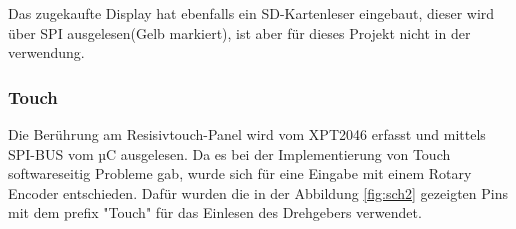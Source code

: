         Das zugekaufte Display hat ebenfalls ein SD-Kartenleser eingebaut, dieser wird 
        über SPI ausgelesen(Gelb markiert), ist aber für dieses Projekt nicht in der verwendung. 


        \subsubsection{Touch}
        Die Berührung am Resisivtouch-Panel wird vom XPT2046 erfasst und mittels 
        SPI-BUS vom µC ausgelesen. Da es bei der Implementierung von Touch softwareseitig
        Probleme gab, wurde sich für eine Eingabe mit einem Rotary Encoder entschieden.
        Dafür wurden die in der Abbildung \ref{fig:sch2} gezeigten Pins mit dem prefix "Touch" 
        für das Einlesen des Drehgebers verwendet.
